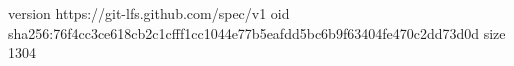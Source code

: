 version https://git-lfs.github.com/spec/v1
oid sha256:76f4cc3ce618cb2c1cfff1cc1044e77b5eafdd5bc6b9f63404fe470c2dd73d0d
size 1304
